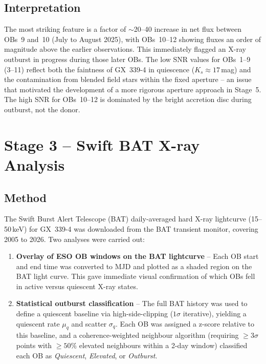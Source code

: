 \documentclass[12pt,a4paper]{article}
\begin{document}
\subsection{Interpretation}
The most striking feature is a factor of $\sim$20--40 increase in net flux
between OBs~9 and~10 (July to August 2025), with OBs~10--12 showing
fluxes an order of magnitude above the earlier observations.  This
immediately flagged an X-ray outburst in progress during those later OBs.
The low SNR values for OBs~1--9 (3--11) reflect both the faintness of
GX~339-4 in quiescence ($K_s \approx 17$\,mag) and the contamination from
blended field stars within the fixed aperture -- an issue that motivated
the development of a more rigorous aperture approach in Stage~5.
The high SNR for OBs~10--12 is dominated by the bright accretion
disc during outburst, not the donor.

\section{Stage 3 -- Swift BAT X-ray Analysis}
\label{sec:bat}

\subsection{Method}
The Swift Burst Alert Telescope (BAT) daily-averaged hard X-ray lightcurve
(15--50\,keV) for GX~339-4 was downloaded from the BAT transient monitor,
covering 2005 to 2026.  Two analyses were carried out:

\begin{enumerate}
  \item \textbf{Overlay of ESO OB windows on the BAT lightcurve} -- Each OB
        start and end time was converted to MJD and plotted as a shaded
        region on the BAT light curve.  This gave immediate visual
        confirmation of which OBs fell in active versus quiescent X-ray
        states.

  \item \textbf{Statistical outburst classification} -- The full BAT
        history was used to define a quiescent baseline via
        high-side-clipping ($1\sigma$ iterative), yielding a quiescent
        rate $\mu_q$ and scatter $\sigma_q$.  Each OB was assigned a
        z-score relative to this baseline, and a coherence-weighted
        neighbour algorithm (requiring $\geq 3\sigma$ points with
        $\geq 50\%$ elevated neighbours within a 2-day window) classified
        each OB as \textit{Quiescent}, \textit{Elevated}, or
        \textit{Outburst}.
\end{enumerate}
\end{document}
